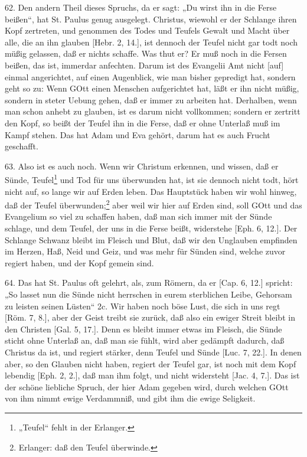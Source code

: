 62. Den andern Theil dieses Spruchs, da er sagt: „Du wirst ihn in die Ferse beißen“, hat St. Paulus genug ausgelegt. Christus, wiewohl er der Schlange ihren Kopf zertreten, und genommen des Todes und Teufels Gewalt und Macht über alle, die an ihn glauben [Hebr. 2, 14.], ist dennoch der Teufel nicht gar todt noch müßig gelassen, daß er nichts schaffe. Was thut er? Er muß noch in die Fersen beißen, das ist, immerdar anfechten. Darum ist des Evangelii Amt nicht [auf] einmal angerichtet, auf einen Augenblick, wie man bisher gepredigt hat, sondern geht so zu: Wenn GOtt einen Menschen aufgerichtet hat, läßt er ihn nicht müßig, sondern in steter Uebung gehen, daß er immer zu arbeiten hat. Derhalben, wenn man schon anhebt zu glauben, ist es darum nicht vollkommen; sondern er zertritt den Kopf, so beißt der Teufel ihn in die Ferse, daß er ohne Unterlaß muß im Kampf stehen. Das hat Adam und Eva gehört, darum hat es auch Frucht geschafft.

63. Also ist es auch noch. Wenn wir Christum erkennen, und wissen, daß er Sünde, Teufel\footnote{„Teufel“ fehlt in der Erlanger.} und Tod für uns überwunden hat, ist sie dennoch nicht todt, hört nicht auf, so lange wir auf Erden leben. Das Hauptstück haben wir wohl hinweg, daß der Teufel überwunden;\footnote{Erlanger: daß den Teufel überwinde.} aber weil wir hier auf Erden sind, soll GOtt und das Evangelium so viel zu schaffen haben, daß man sich immer mit der Sünde schlage, und dem Teufel, der uns in die Ferse beißt, widerstehe [Eph. 6, 12.]. Der Schlange Schwanz bleibt im Fleisch und Blut, daß wir den Unglauben empfinden im Herzen, Haß, Neid und Geiz, und was mehr für Sünden sind, welche zuvor regiert haben, und der Kopf gemein sind.

64. Das hat St. Paulus oft gelehrt, als, zum Römern, da er [Cap. 6, 12.] spricht: „So lasset nun die Sünde nicht herrschen in eurem sterblichen Leibe, Gehorsam zu leisten seinen Lüsten“ 2c. Wir haben noch böse Lust, die sich in uns regt [Röm. 7, 8.], aber der Geist treibt sie zurück, daß also ein ewiger Streit bleibt in den Christen [Gal. 5, 17.]. Denn es bleibt immer etwas im Fleisch, die Sünde sticht ohne Unterlaß an, daß man sie fühlt, wird aber gedämpft dadurch, daß Christus da ist, und regiert stärker, denn Teufel und Sünde [Luc. 7, 22.]. In denen aber, so den Glauben nicht haben, regiert der Teufel gar, ist noch mit dem Kopf lebendig [Eph. 2, 2.], daß man ihm folgt, und nicht widersteht [Jac. 4, 7.]. Das ist der schöne liebliche Spruch, der hier Adam gegeben wird, durch welchen GOtt von ihm nimmt ewige Verdammniß, und gibt ihm die ewige Seligkeit.

